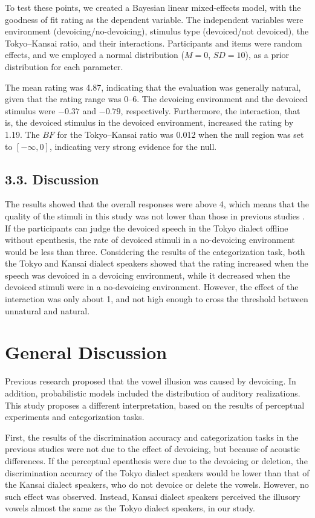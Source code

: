 \documentclass[a4paper,11pt,twocolumn]{article}
\begin{document}
To test these points, we created a Bayesian linear mixed-effects model, with the goodness of fit rating as the dependent variable. The independent variables were environment (devoicing/no-devoicing), stimulus type (devoiced/not devoiced), the Tokyo--Kansai ratio, and their interactions. Participants and items were random effects, and we employed a normal distribution ($M=0$, $SD=10$), as a prior distribution for each parameter.

The mean rating was 4.87, indicating that the evaluation was generally natural, given that the rating range was 0--6. The devoicing environment and the devoiced stimulus were $-0.37$ and $-0.79$, respectively. Furthermore, the interaction, that is, the devoiced stimulus in the devoiced environment, increased the rating by 1.19. The $BF$ for the Tokyo--Kansai ratio was 0.012 when the null region was set to $[-\infty, 0]$, indicating very strong evidence for the null.

\subsection{3.3. Discussion}

The results showed that the overall responses were above 4, which means that the quality of the stimuli in this study was not lower than those in previous studies \cite{kilpatrick2018japanese}. If the participants can judge the devoiced speech in the Tokyo dialect offline without epenthesis, the rate of devoiced stimuli in a no-devoicing environment would be less than three. Considering the results of the categorization task, both the Tokyo and Kansai dialect speakers showed that the rating increased when the speech was devoiced in a devoicing environment, while it decreased when the devoiced stimuli were in a no-devoicing environment. However, the effect of the interaction was only about 1, and not high enough to cross the threshold between unnatural and natural.

\section{General Discussion}

Previous research proposed that the vowel illusion was caused by devoicing. In addition, probabilistic models included the distribution of auditory realizations. This study proposes a different interpretation, based on the results of perceptual experiments and categorization tasks.

First, the results of the discrimination accuracy and categorization tasks in the previous studies were not due to the effect of devoicing, but because of acoustic differences. If the perceptual epenthesis were due to the devoicing or deletion, the discrimination accuracy of the Tokyo dialect speakers would be lower than that of the Kansai dialect speakers, who do not devoice or delete the vowels. However, no such effect was observed. Instead, Kansai dialect speakers perceived the illusory vowels almost the same as the Tokyo dialect speakers, in our study.
\end{document}
